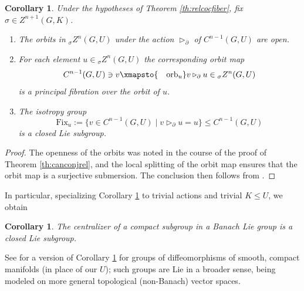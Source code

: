 \documentclass[pdftex]{sigma}
\numberwithin{equation}{section}
\newtheorem{Corollary}[Theorem]{Corollary}
\begin{document}
\begin{Corollary}\label{cor:orbisfibrel}
 Under the hypotheses of Theorem {\rm \ref{th:relcocfiber}}, fix $\sigma\in Z^{n+1}(G,K)$.
 \begin{enumerate}[$(1)$]\itemsep=0pt
 \item The orbits in ${}_{\sigma}Z^n(G,U)$ under the action $\triangleright_{\partial}$ of $C^{n-1}(G,U)$ are open.

 \item For each element $u\in {}_{\sigma}Z^n(G,U)$ the corresponding orbit map
 \begin{equation*}
 C^{n-1}(G,U)\ni v\xmapsto{\quad\mathrm{orb}_u}v\triangleright_{\partial}u\in {}_{\sigma}Z^n(G,U)
 \end{equation*}
 is a principal fibration over the orbit of $u$.

 \item\label{item:orbisfib} The isotropy group
 \begin{equation*}
 \mathrm{Fix}_u:=\big\{v\in C^{n-1}(G,U)\mid v\triangleright_{\partial}u = u\big\}\le C^{n-1}(G,U)
 \end{equation*}
 is a closed Lie subgroup.
 \end{enumerate}
\end{Corollary}
\begin{proof}


 The openness of the orbits was noted in the course of the proof of Theorem \ref{th:canconjrel}, and the local splitting of the orbit map ensures that the orbit map is a surjective submersion. The conclusion then follows from \cite[Section~III.1.6, Proposition 12]{bourb-lie-13}.
\end{proof}

In particular, specializing Corollary \ref{cor:orbisfibrel} to trivial actions and trivial $K\le U$, we obtain

\begin{Corollary}\label{cor:centcpct}
 The centralizer of a compact subgroup in a Banach Lie group is a closed Lie subgroup. \qedhere
\end{Corollary}

\begin{Remark}
 See \cite[Section~VI.3\,(A)]{om-inflie-bk} for a version of Corollary \ref{cor:centcpct} for groups of diffeomorphisms of smooth, compact manifolds (in place of our $U$); such groups are Lie in a broader sense, being modeled on more general topological (non-Banach) vector spaces.
\end{Remark}
\end{document}
